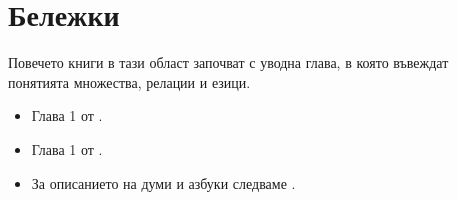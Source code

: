 \section*{Бележки}

Повечето книги в тази област започват с уводна глава, в която въвеждат понятията множества, релации и езици.
\begin{itemize}
\item 
  Глава 1 от \cite{rosen}.
\item
  Глава 1 от \cite{papadimitriou}.
\item
  За описанието на думи и азбуки следваме \cite[Глава 2]{kozen}.
\end{itemize}



